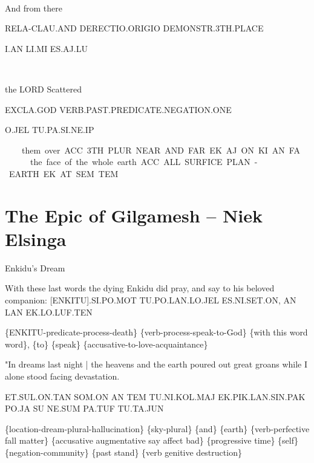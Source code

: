 {{\at\tem\Atlansum~\ek\me\set\on
\drie

 

And 			from 			there 		

RELA-CLAU.AND	DERECTIO.ORIGIO      DEMONSTR.3TH.PLACE 

I.AN			LI.MI			ES.AJ.LU			 

\Atlani\an~\li\mi~\es\aj\lu


the LORD	Scattered 

EXCLA.GOD	VERB.PAST.PREDICATE.NEGATION.ONE 

O.JEL		TU.PA.SI.NE.IP    

\Atlano\jel~\tu\pa\si\Atlanne\ip
\drie

 

 them 		over 		 

ACC.3TH.PLUR	NEAR.AND.FAR	 

EK.AJ.ON	KI.AN.FA               

\ek\aj\on~\ki\an\fa
\drie

  

the face of the whole earth. 

ACC.ALL.SURFICE.PLAN-EARTH 

EK.AT.SEM.TEM 

\ek\at\sem\tem
\drie


\section{The Epic of Gilgamesh -- {\small Niek Elsinga}}


Enkidu’s Dream 

 
 

With these last words the dying Enkidu did pray, and say to his beloved companion:  
 [ENKITU].SI.PO.MOT TU.PO.LAN.LO.JEL ES.NI.SET.ON, AN LAN EK.LO.LUF.TEN 

\{ENKITU-predicate-process-death\} \{verb-process-speak-to-God\} \{with this word word\}, \{to\} \{speak\} \{accusative-to-love-acquaintance\} 

 
 

"In dreams last night | the heavens and the earth poured out great groans while I alone stood facing devastation.  

ET.SUL.ON.TAN SOM.ON AN TEM TU.NI.KOL.MAJ EK.PIK.LAN.SIN.PAK PO.JA SU NE.SUM PA.TUF TU.TA.JUN 

\{location-dream-plural-hallucination\} \{sky-plural\} \{and\} \{earth\} \{verb-perfective fall matter\} \{accusative augmentative say affect bad\} \{progressive time\} \{self\} \{negation-community\} \{past stand\} \{verb genitive destruction\} 

}}
